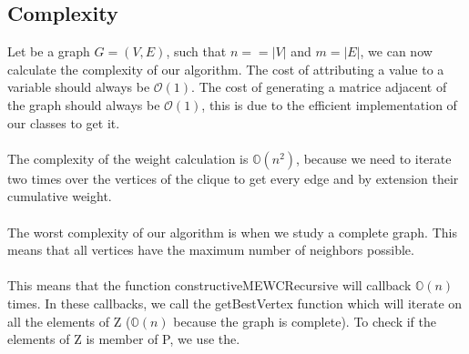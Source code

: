 
\subsection{Complexity}

    Let be a graph $G = (V,E)$, such that $n = =|V|$ and $m = |E|$, we can now calculate the complexity of our algorithm. The cost of attributing a value to a variable should always be $\mathcal{O}(1)$. The cost of generating a matrice adjacent of the graph should always be $\mathcal{O}(1)$, this is due to the efficient implementation of our classes to get it.
    \\ \\ 
    The complexity of the weight calculation is $\mathbb{O}(n^2)$, because we need to iterate two times over the vertices of the clique to get every edge and by extension their cumulative weight.
    \\ \\
    The worst complexity of our algorithm is when we study a complete graph. This means that all vertices have the maximum number of neighbors possible. 
    \\ \\
    This means that the function constructiveMEWCRecursive will callback $\mathbb{O}(n)$ times. In these callbacks, we call the getBestVertex function which will iterate on all the elements of Z ($\mathbb{O}(n)$ because the graph is complete). To check if the elements of Z is member of P, we use the.
